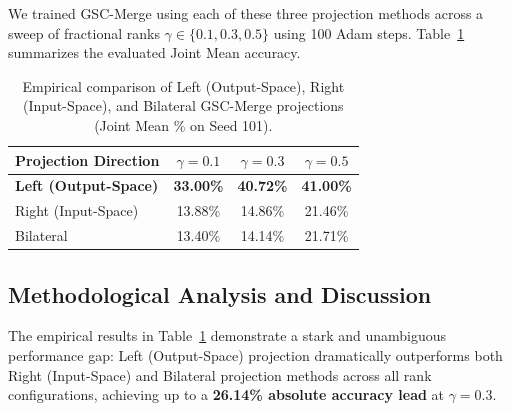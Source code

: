 \documentclass{article}
\theoremstyle{plain}
\theoremstyle{definition}
\theoremstyle{remark}
\begin{document}
We trained GSC-Merge using each of these three projection methods across a sweep of fractional ranks $\gamma \in \{0.1, 0.3, 0.5\}$ using 100 Adam steps. Table~\ref{tab:projection_directions} summarizes the evaluated Joint Mean accuracy.

\begin{table}[h]
\caption{Empirical comparison of Left (Output-Space), Right (Input-Space), and Bilateral GSC-Merge projections (Joint Mean \% on Seed 101).}
\label{tab:projection_directions}
\vskip 0.15in
\begin{center}
\begin{small}
\begin{sc}
\begin{tabular}{lccc}
\toprule
Projection Direction & $\gamma = 0.1$ & $\gamma = 0.3$ & $\gamma = 0.5$ \\
\midrule
\textbf{Left (Output-Space)} & \textbf{33.00\%} & \textbf{40.72\%} & \textbf{41.00\%} \\
Right (Input-Space)     & 13.88\% & 14.86\% & 21.46\% \\
Bilateral               & 13.40\% & 14.14\% & 21.71\% \\
\bottomrule
\end{tabular}
\end{sc}
\end{small}
\end{center}
\vskip -0.1in
\end{table}

\subsection{Methodological Analysis and Discussion}

The empirical results in Table~\ref{tab:projection_directions} demonstrate a stark and unambiguous performance gap: Left (Output-Space) projection dramatically outperforms both Right (Input-Space) and Bilateral projection methods across all rank configurations, achieving up to a \textbf{26.14\% absolute accuracy lead} at $\gamma=0.3$.
\end{document}
